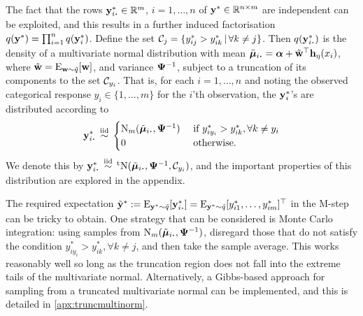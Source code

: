 The fact that the rows $\by_{i \bigcdot}^* \in \bbR^m$, $i=1,\dots,n$ of ${\mathbf y}^* \in \mathbb{R}^{n \times m}$ are independent can be exploited, and this results in a further induced factorisation $q({\mathbf y}^*) = \prod_{i=1}^n q({\mathbf y}_i^*)$.
Define the set ${\mathcal C}_j = \{y_{ij}^* > y_{ik}^* \,|\, \forall k\neq j \}$.
Then $q(\by_{i \bigcdot}^*)$ is the density of a multivariate normal distribution with mean $\tilde \bmu_{i \bigcdot} = \balpha + \tilde\bw^\top  \bh_\eta(x_i)$, where $\tilde {{\mathbf w}} = \operatorname{E}_{{\mathbf w}\sim\tilde q}[{\mathbf w}]$, and variance ${\bm\Psi}^{-1}$, subject to a truncation of its components to the set ${\mathcal C}_{y_i}$.
That is, for each $i=1,\dots,n$ and noting the observed categorical response $y_i \in \{1,\dots,m\}$ for the $i$'th observation, the ${\mathbf y}_i^*$'s are distributed according to
\begin{align}\label{eq:ystardist}
  \by_{i \bigcdot}^* \iid
  \begin{cases}
    \N_m(\tilde\bmu_{i \bigcdot},  \bPsi^{-1}) & \text{ if } y_{iy_i}^* > y_{ik}^*, \forall k \neq y_i \\
    0 & \text{ otherwise}. \\
  \end{cases}
\end{align}
We denote this by $\by_{i \bigcdot}^* \iid \tN(\tilde\bmu_{i \bigcdot}, \bPsi^{-1},\cC_{y_i})$, and the important properties of this distribution are explored in the appendix.

The required expectation $\tilde\by^* := \E_{\by^*\sim\tilde q} [\by^*_{i\bigcdot}] = \E_{\by^*\sim\tilde q} [y_{i1}^*,\dots, y_{im}^*]^\top$ in the M-step can be tricky to obtain.
One strategy that can be considered is Monte Carlo integration: using samples from $\N_m(\tilde\bmu_{i \bigcdot},  \bPsi^{-1})$, disregard those that do not satisfy the condition $y_{iy_i}^* > y_{ik}^*, \forall k \neq j$, and then take the sample average.
This works reasonably well so long as the truncation region does not fall into the extreme tails of the multivariate normal.
Alternatively, a Gibbs-based approach \citep{robert1995simulation} for sampling from a truncated multivariate normal can be implemented, and this is detailed in \cref{apx:truncmultinorm}.

